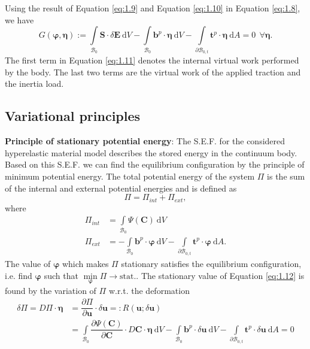 Using the result of Equation \eqref{eq:1.9} and Equation \eqref{eq:1.10} in Equation \eqref{eq:1.8}, we have
\begin{equation}
G(\bm{\varphi},\bm{\eta}):= \int\limits_{\mathcal{B}_0} \mathbf{S} \cdot \delta \mathbf{E} \ \mathrm{d}V - \int\limits_{\mathcal{B}_0} \mathbf{b}^p \cdot \bm{\eta} \ \mathrm{d}V - \int\limits_{\mathcal{\partial B}_{0,t}} \mathbf{t}^p \cdot \bm{\eta} \ \mathrm{d}A = 0 \ \ \forall \bm{\eta}.
\label{eq:1.11}
\end{equation}
The first term in Equation \eqref{eq:1.11} denotes the internal virtual work performed by the body. The last two terms are the virtual work of the applied traction and the inertia load.

\subsection{Variational principles}
\textbf{Principle of stationary potential energy}: The S.E.F. for the considered hyperelastic material model describes the stored energy in the continuum body. Based on this S.E.F. we can find the equilibrium configuration by the principle of minimum potential energy. The total potential energy of the system $\Pi$ is the sum of the internal and external potential energies and is defined as 
\begin{equation}
\Pi = \Pi_{int} + \Pi_{ext},
\label{eq:1.12}
\end{equation}
where 
\begin{align}
\Pi_{int} &= \int\limits_{\mathcal{B}_0} \Psi (\mathbf{C}) \ \mathrm{d}V \\
\Pi_{ext} &= - \int\limits_{\mathcal{B}_0} \mathbf{b}^p \cdot \bm{\varphi} \ \mathrm{d}V - \int\limits_{\mathcal{\partial B}_{0,t}} \mathbf{t}^p \cdot \bm{\varphi} \ \mathrm{d}A.
\end{align}
The value of $\bm{\varphi}$ which makes $\Pi$ stationary satisfies the equilibrium configuration, i.e. find $\bm{\varphi}$ such that $\min\limits_{\bm{\varphi}} \Pi \to \text{stat.}$. The stationary value of Equation \eqref{eq:1.12} is found by the variation of $\Pi$ w.r.t. the deformation
\begin{align}
\delta \Pi = D \Pi \cdot \bm{\eta} &= \dfrac{\partial \Pi}{\partial \mathbf{u}} \cdot \delta \mathbf{u} =: R(\mathbf{u}; \delta \mathbf{u})\nonumber \\
&= \int\limits_{\mathcal{B}_0} \dfrac{\partial \Psi (\mathbf{C})}{\partial \mathbf{C}} \cdot D \mathbf{C} \cdot \bm{\eta} \ \mathrm{d}V - \int\limits_{\mathcal{B}_0} \mathbf{b}^p \cdot \delta \mathbf{u} \ \mathrm{d}V - \int\limits_{\mathcal{\partial B}_{0,t}} \mathbf{t}^p \cdot \delta \mathbf{u} \ \mathrm{d}A = 0
\end{align}
